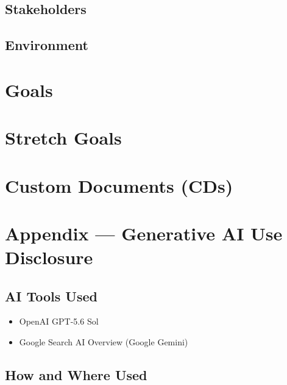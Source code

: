 \documentclass{article}
\begin{document}


\subsection{Stakeholders}



\subsection{Environment}



\section{Goals}



\section{Stretch Goals}



\section{Custom Documents (CDs)}



\newpage{}

\section{Appendix --- Generative AI Use Disclosure}

\subsection{AI Tools Used}

\begin{itemize}
	\item OpenAI GPT-5.6 Sol
	\item Google Search AI Overview (Google Gemini)
\end{itemize}

\subsection{How and Where Used}
\end{document}

